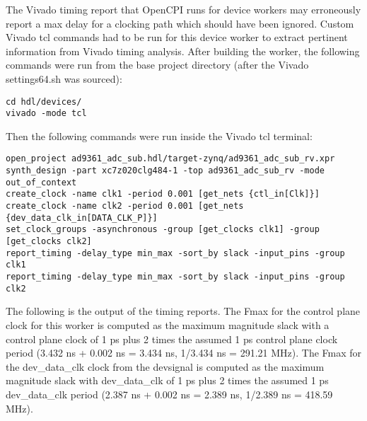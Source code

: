 \documentclass{article}
\begin{document}
The Vivado timing report that OpenCPI runs for device workers may erroneously report a max delay for a clocking path which should have been ignored. Custom Vivado tcl commands had to be run for this device worker to extract pertinent information from Vivado timing analysis. After building the worker, the following commands were run from the base project directory (after the Vivado settings64.sh was sourced):
\lstset{language=bash, columns=flexible, breaklines=true, prebreak=\textbackslash, basicstyle=\ttfamily, showstringspaces=false,upquote=true, aboveskip=\baselineskip, belowskip=\baselineskip}
\begin{lstlisting}
cd hdl/devices/
vivado -mode tcl
\end{lstlisting}
Then the following commands were run inside the Vivado tcl terminal:
\begin{lstlisting}
open_project ad9361_adc_sub.hdl/target-zynq/ad9361_adc_sub_rv.xpr
synth_design -part xc7z020clg484-1 -top ad9361_adc_sub_rv -mode out_of_context
create_clock -name clk1 -period 0.001 [get_nets {ctl_in[Clk]}]
create_clock -name clk2 -period 0.001 [get_nets {dev_data_clk_in[DATA_CLK_P]}]
set_clock_groups -asynchronous -group [get_clocks clk1] -group [get_clocks clk2]
report_timing -delay_type min_max -sort_by slack -input_pins -group clk1
report_timing -delay_type min_max -sort_by slack -input_pins -group clk2
\end{lstlisting}
The following is the output of the timing reports. The Fmax for the control plane clock for this worker is computed as the maximum magnitude slack with a control plane clock of 1 ps plus 2 times the assumed 1 ps control plane clock period (3.432 ns + 0.002 ns = 3.434 ns, 1/3.434 ns = 291.21 MHz). The Fmax for the dev\_data\_clk clock from the devsignal is computed as the maximum magnitude slack with dev\_data\_clk of 1 ps plus 2 times the assumed 1 ps dev\_data\_clk period (2.387 ns + 0.002 ns = 2.389 ns, 1/2.389 ns = 418.59 MHz).
\fontsize{6}{12}\selectfont
\end{document}
